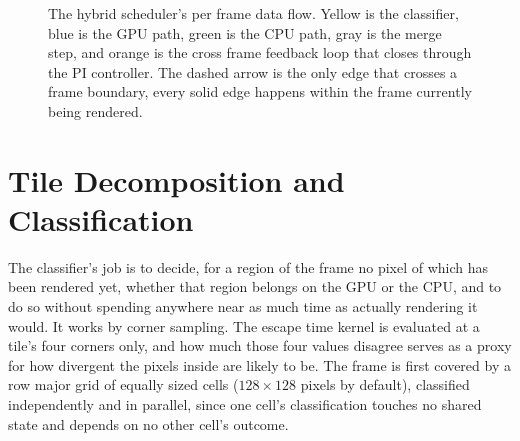 \documentclass{ftndiplomski}
\begin{document}
\begin{figure}[H]
{%
  }
  \caption{The hybrid scheduler's per frame data flow. Yellow is the classifier, blue is the GPU
  path, green is the CPU path, gray is the merge step, and orange is the cross frame feedback loop
  that closes through the PI controller. The dashed arrow is the only edge that crosses a frame
  boundary, every solid edge happens within the frame currently being rendered.}
  \label{fig:scheduler-diagram}
\end{figure}

\section{Tile Decomposition and Classification}
\label{sec:tile-decomposition}

The classifier's job is to decide, for a region of the frame no pixel of which has been rendered
yet, whether that region belongs on the GPU or the CPU, and to do so without spending anywhere
near as much time as actually rendering it would. It works by corner sampling. The escape time
kernel is evaluated at a tile's four corners only, and how much those four values disagree serves
as a proxy for how divergent the pixels inside are likely to be. The frame is first covered by a
row major grid of equally sized cells ($128 \times 128$ pixels by default), classified
independently and in parallel, since one cell's classification touches no shared
state and depends on no other cell's outcome.
\end{document}
